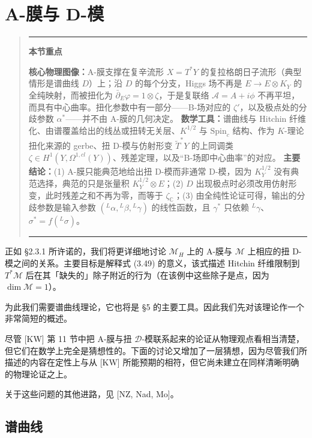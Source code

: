 \documentclass[11pt,a4paper]{article}
\newenvironment{keytakeaway}
  {\par\medskip\begin{quote}\small\noindent
   \rule{\linewidth}{0.6pt}\par\nopagebreak\smallskip\noindent
   \textbf{本节重点}\par\nobreak\smallskip\noindent\ignorespaces}
  {\par\smallskip\noindent\rule{\linewidth}{0.6pt}\end{quote}\medskip}
\begin{document}
\section{A-膜与 D-模}

\begin{keytakeaway}
\textbf{核心物理图像：}A-膜支撑在复辛流形 $X=T^*Y$ 的复拉格朗日子流形（典型情形是谱曲线 $D$）上；沿 $D$ 的每个分支，Higgs 场不再是 $E\to E\otimes K_Y$ 的全纯映射，而被扭化为 $\bar\partial_E\varphi=1\otimes\zeta$，于是复联络 $\mathcal{A}=A+i\phi$ 不再平坦，而具有中心曲率。扭化参数中有一部分——B-场对应的 $\zeta'$，以及极点处的分歧参数 $\alpha^*$——并不由 A-膜的几何决定。
\textbf{数学工具：}谱曲线与 Hitchin 纤维化、由谱覆盖给出的线丛或扭转无关层、$K^{1/2}$ 与 $\mathrm{Spin}_c$ 结构、作为 $K$-理论扭化来源的 gerbe、扭 D-模与仿射形变 $\widetilde{T}^*Y$ 的上同调类 $\zeta\in H^1(Y,\Omega^{1,cl}(Y))$、残差定理，以及“B-场即中心曲率”的对应。
\textbf{主要结论：}(1) A-膜只能典范地给出扭 D-模而非通常 D-模，因为 $K_Y^{1/2}$ 没有典范选择，典范的只是张量积 $K_Y^{1/2}\otimes E$；(2) $D$ 出现极点时必须改用仿射形变，此时残差之和不再为零，而等于 $\zeta_{\mathbb{C}}$；(3) 由全纯性论证可得，输出的分歧参数是输入参数 $({}^L\alpha,{}^L\beta,{}^L\gamma)$ 的线性函数，且 $\gamma^*$ 只依赖 ${}^L\gamma$、$\sigma^*=f({}^L\sigma)$。
\end{keytakeaway}

正如 §2.3.1 所许诺的，我们将更详细地讨论 $\mathcal{M}_H$ 上的 A-膜与 $\mathcal{M}$ 上相应的扭 D-模之间的关系。主要目标是解释式 (3.49) 的意义，该式描述 Hitchin 纤维限制到 $T^*\mathcal{M}$ 后在其「缺失的」除子附近的行为（在该例中这些除子是点，因为 $\dim\mathcal{M}=1$）。


为此我们需要谱曲线理论，它也将是 §5 的主要工具。因此我们先对该理论作一个非常简短的概述。

尽管 [KW] 第 11 节中把 A-膜与扭 $\mathcal{D}$-模联系起来的论证从物理观点看相当清楚，但它们在数学上完全是猜想性的。下面的讨论又增加了一层猜想，因为尽管我们所描述的内容在定性上与从 [KW] 所能预期的相符，但它尚未建立在同样清晰明确的物理论证之上。

关于这些问题的其他进路，见 [NZ, Nad, Mo]。

\subsection{谱曲线}
\end{document}
